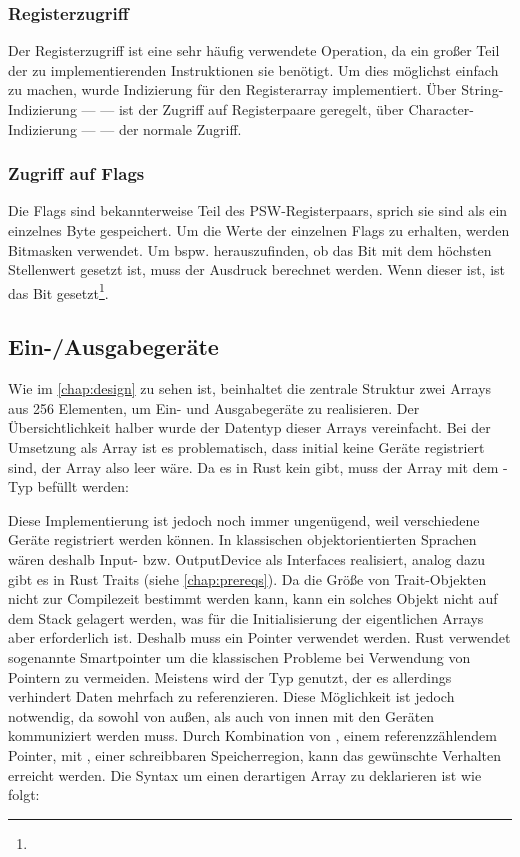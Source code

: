 \subsubsection{Registerzugriff}

Der Registerzugriff ist eine sehr häufig verwendete Operation, da ein großer Teil der zu implementierenden Instruktionen sie benötigt. Um dies möglichst einfach zu machen, wurde Indizierung für den Registerarray implementiert. Über String-Indizierung ---  --- ist der Zugriff auf Registerpaare geregelt, über Character-Indizierung ---  --- der normale Zugriff.

\subsubsection{Zugriff auf Flags}

Die Flags sind bekannterweise Teil des \ac{PSW}-Registerpaars, sprich sie sind als ein einzelnes Byte gespeichert. Um die Werte der einzelnen Flags zu erhalten, werden Bitmasken verwendet. Um bspw. herauszufinden, ob das Bit mit dem höchsten Stellenwert gesetzt ist, muss der Ausdruck  berechnet werden. Wenn dieser  ist, ist das Bit gesetzt\footnote{}.

\subsection{Ein-/Ausgabegeräte}

Wie im \cref{chap:design} zu sehen ist, beinhaltet die zentrale Struktur zwei Arrays aus 256 Elementen, um Ein- und Ausgabegeräte zu realisieren. Der Übersichtlichkeit halber wurde der Datentyp dieser Arrays vereinfacht. Bei der Umsetzung als Array ist es problematisch, dass initial keine Geräte registriert sind, der Array also leer wäre. Da es in Rust kein  gibt, muss der Array mit dem -Typ befüllt werden:

\qquad{}

Diese Implementierung ist jedoch noch immer ungenügend, weil verschiedene Geräte registriert werden können. In klassischen objektorientierten Sprachen wären deshalb Input- bzw. OutputDevice als Interfaces realisiert, analog dazu gibt es in Rust Traits (siehe \cref{chap:prereqs}). Da die Größe von Trait-Objekten nicht zur Compilezeit bestimmt werden kann, kann ein solches Objekt nicht auf dem Stack gelagert werden, was für die Initialisierung der eigentlichen Arrays aber  erforderlich ist. Deshalb muss ein Pointer verwendet werden. Rust verwendet sogenannte \glqq Smartpointer\grqq{} um die klassischen Probleme bei Verwendung von Pointern zu vermeiden. Meistens wird der Typ  genutzt, der es allerdings verhindert Daten mehrfach zu referenzieren. Diese Möglichkeit ist jedoch notwendig, da sowohl von außen, als auch von innen mit den Geräten kommuniziert werden muss. Durch Kombination von , einem referenzzählendem Pointer, mit , einer schreibbaren Speicherregion, kann das gewünschte Verhalten erreicht werden. Die Syntax um einen derartigen Array zu deklarieren ist wie folgt:

